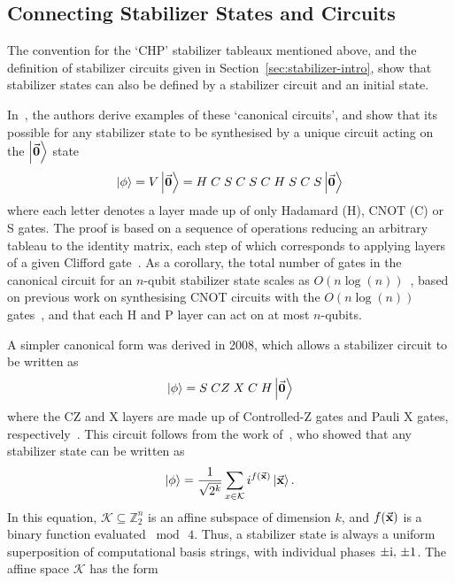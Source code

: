 \subsection{Connecting Stabilizer States and Circuits}
The convention for the `CHP' stabilizer tableaux mentioned above, and the definition of stabilizer circuits given in Section~\ref{sec:stabilizer-intro}, show that stabilizer states can also be defined by a stabilizer circuit and an initial state.\par
In~\cite{Aaronson2004}, the authors derive examples of these `canonical circuits', and show that its possible for any stabilizer state to be synthesised by a unique circuit acting on the $\ket{\va{0}}$ state
\begin{equation}
    \ket{\phi} = V\ket{\va{0}} = H\;C\;S\;C\;S\;C \;H \; S \;C \;S \ket{\va{0}}\label{eq:chpcirc}
\end{equation}
where each letter denotes a layer made up of only Hadamard (H), CNOT (C) or S gates. The proof is based on  a sequence of operations reducing an arbitrary tableau to the identity matrix, each step of which corresponds to applying layers of a given Clifford gate~\cite{Aaronson2004}. As a corollary, the total number of gates in the canonical circuit for an $n$-qubit stabilizer state scales as $O(n\log (n))$~\cite{Aaronson2004}, based on previous work on synthesising CNOT circuits with the $O(n\log (n))$ gates~\cite{Patel2003}, and that each H and P layer can act on at most $n$-qubits.\par
A simpler canonical form was derived in 2008, which allows a stabilizer circuit to be written as
\begin{equation}
    \ket{\phi} = S\;CZ\;X\;C\;H \ket{\va{0}} \label{eq:affinecirc}
\end{equation}
where the CZ and X layers are made up of Controlled-Z gates and Pauli X gates, respectively~\cite{VandenNest2008}. This circuit follows from the work of~\cite{Dehaene2003}, who showed that any stabilizer state can be written as
\begin{equation}
    \ket{\phi} = \frac{1}{\sqrt{2^{k}}}\sum_{x\in\mathcal{K}} i^{f(\va{x})}\ket{\va{x}}.\label{eq:affineform}
\end{equation}
In this equation, $\mathcal{K}\subseteq\mathbb{Z}_{2}^{n}$ is an affine subspace of dimension $k$, and $f(\va{x})$ is a binary  function evaluated $\bmod \,4$. Thus, a stabilizer state is always a uniform superposition of computational basis strings, with individual phases $\pm \mathrm{i},\,\pm 1$. The affine space $\mathcal{K}$ has the form
